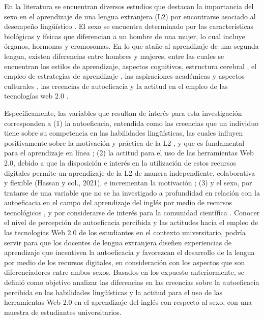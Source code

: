 \documentclass[spanish]{textolivre}
\begin{document}
En la literatura se encuentran diversos estudios que destacan la importancia del sexo en el aprendizaje de una lengua extranjera (L2) por encontrarse asociado al desempeño lingüístico \cite{gomez_paniagua_diferencias_2018,nguyen_relationship_2022,dong_influential_2023,csizer_gender-related_2024}. El sexo se encuentra determinado por las características biológicas y físicas que diferencian a un hombre de una mujer, lo cual incluye órganos, hormonas y cromosomas. En lo que atañe al aprendizaje de una segunda lengua, existen diferencias entre hombres y mujeres, entre las cuales se encuentran los estilos de aprendizaje, aspectos cognitivos, estructura cerebral \cite{gomez_paniagua_diferencias_2018}, el empleo de estrategias de aprendizaje \cite{alrabai_association_2018}, las aspiraciones académicas y aspectos culturales \cite{dong_influential_2023}, las creencias de autoeficacia \cite{mwaura_gender_2021,nguyen_relationship_2022} y la actitud en el empleo de las tecnologías web 2.0 \cite{jarrah_arab_2021,ningsih_gender-based_2022}. 

Específicamente, las variables que resultan de interés para esta investigación corresponden a (1) la autoeficacia, entendida como las creencias que un individuo tiene sobre su competencia en las habilidades lingüísticas, las cuales influyen positivamente sobre la motivación y práctica de la L2 \cite{bandura_self-efficacy:_1997,namaziandost_account_2020}, y que es fundamental para el aprendizaje en línea \cite{csizer_gender-related_2024}; (2) la actitud para el uso de las herramientas Web 2.0, debido a que la disposición e interés en la utilización de estos recursos digitales permite un aprendizaje de la L2 de manera independiente, colaborativa y flexible (Hassan y col., 2021), e incrementan la motivación \cite{asiksoy_elt_2018}; (3) y el sexo, por tratarse de una variable que no se ha investigado a profundidad en relación con la autoeficacia en el campo del aprendizaje del inglés por medio de recursos tecnológicos \cite{namaziandost_account_2020}, y por considerarse de interés para la comunidad científica \cite{jarrah_arab_2021,dong_influential_2023,csizer_gender-related_2024}. Conocer el nivel de percepción de autoeficacia percibida y las actitudes hacia el empleo de las tecnologías Web 2.0 de los estudiantes en el contexto universitario, podría servir para que los docentes de lengua extranjera diseñen experiencias de aprendizaje que incentiven la autoeficacia y favorezcan el desarrollo de la lengua por medio de los recursos digitales, en consideración con los aspectos que son diferenciadores entre ambos sexos. Basados en los expuesto anteriormente, se definió como objetivo analizar las diferencias en las creencias sobre la autoeficacia percibida en las habilidades lingüísticas y la actitud para el uso de las herramientas Web 2.0 en el aprendizaje del inglés con respecto al sexo, con una muestra de estudiantes universitarios.
\end{document}
